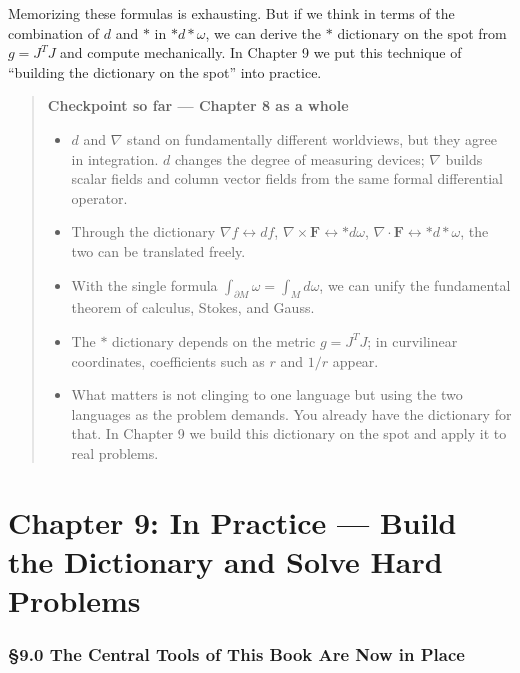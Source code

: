 Memorizing these formulas is exhausting. But if we think in terms of the
combination of \(d\) and \(\ast\) in \(\ast d\ast\omega\), we can derive
the \(\ast\) dictionary on the spot from \(g = J^T J\) and compute
mechanically. In Chapter 9 we put this technique of ``building the
dictionary on the spot'' into practice.

\begin{quote}
\textbf{Checkpoint so far — Chapter 8 as a whole}

\begin{itemize}
\item
  \(d\) and \(\nabla\) stand on fundamentally different worldviews, but
  they agree in integration. \(d\) changes the degree of measuring
  devices; \(\nabla\) builds scalar fields and column vector fields from
  the same formal differential operator.
\item
  Through the dictionary \(\nabla f \leftrightarrow df\),
  \(\nabla\times\mathbf{F} \leftrightarrow \ast d\omega\),
  \(\nabla\cdot\mathbf{F} \leftrightarrow \ast d\ast\omega\), the two
  can be translated freely.
\item
  With the single formula \(\int_{\partial M}\omega = \int_M d\omega\),
  we can unify the fundamental theorem of calculus, Stokes, and Gauss.
\item
  The \(\ast\) dictionary depends on the metric \(g = J^T J\); in
  curvilinear coordinates, coefficients such as \(r\) and \(1/r\)
  appear.
\item
  What matters is not clinging to one language but using the two
  languages as the problem demands. You already have the dictionary for
  that. In Chapter 9 we build this dictionary on the spot and apply it
  to real problems.
\end{itemize}
\end{quote}

\newpage

\hypertarget{chapter-9-in-practice-build-the-dictionary-and-solve-hard-problems}{%
\chapter{Chapter 9: In Practice --- Build the Dictionary and Solve Hard
Problems}\label{chapter-9-in-practice-build-the-dictionary-and-solve-hard-problems}}

\hypertarget{the-central-tools-of-this-book-are-now-in-place}{%
\subsection{§9.0 The Central Tools of This Book Are Now in
Place}\label{the-central-tools-of-this-book-are-now-in-place}}

